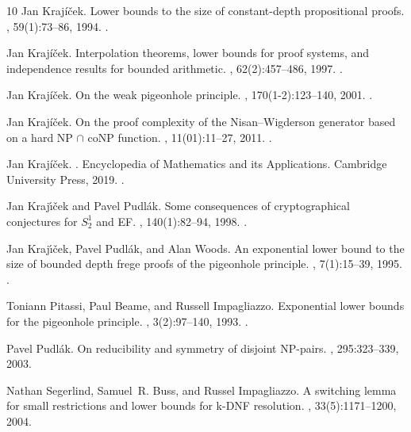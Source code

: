 \documentclass[10pt,a4paper]{article}
\theoremstyle{remark}
\newtheorem*{switching lemma}{Switching Lemma}
\newtheorem*{open problem}{Open Problem}
\theoremstyle{definition}
\begin{document}
\begin{thebibliography}{10}
Jan Kraj{\'i}{\v{c}}ek.
\newblock Lower bounds to the size of constant-depth propositional proofs.
, 59(1):73--86, 1994.
\newblock \href {http://dx.doi.org/10.2307/2275250}
  {}.

Jan Kraj{\'i}{\v{c}}ek.
\newblock Interpolation theorems, lower bounds for proof systems, and
  independence results for bounded arithmetic.
, 62(2):457--486, 1997.
\newblock \href {http://dx.doi.org/10.2307/2275541}
  {}.

Jan Kraj{\'i}{\v{c}}ek.
\newblock On the weak pigeonhole principle.
, 170(1-2):123--140, 2001.
\newblock \href {http://dx.doi.org/10.4064/fm170-1-8}
  {}.

Jan Kraj{\'i}{\v{c}}ek.
\newblock On the proof complexity of the {N}isan--{W}igderson generator based
  on a hard {NP} $\cap$ co{NP} function.
, 11(01):11--27, 2011.
\newblock \href {http://dx.doi.org/10.1142/S0219061311000979}
  {}.

Jan Kraj{\'i}{\v{c}}ek.
.
\newblock Encyclopedia of Mathematics and its Applications. Cambridge
  University Press, 2019.
\newblock \href {http://dx.doi.org/10.1017/9781108242066}
  {}.

Jan Kraj\'{\i}\v{c}ek and Pavel Pudl\'{a}k.
\newblock Some consequences of cryptographical conjectures for ${S}_2^1$ and
  {EF}.
, 140(1):82--94, 1998.
\newblock \href {http://dx.doi.org/10.1006/inco.1997.2674}
  {}.

Jan Kraj\'{\i}\v{c}ek, Pavel Pudl\'{a}k, and Alan Woods.
\newblock An exponential lower bound to the size of bounded depth frege proofs
  of the pigeonhole principle.
, 7(1):15--39, 1995.
\newblock \href {http://dx.doi.org/10.1002/rsa.3240070103}
  {}.

Toniann Pitassi, Paul Beame, and Russell Impagliazzo.
\newblock Exponential lower bounds for the pigeonhole principle.
, 3(2):97--140, 1993.
\newblock \href {http://dx.doi.org/10.1007/BF01200117}
  {}.

Pavel Pudl\'ak.
\newblock On reducibility and symmetry of disjoint {NP}-pairs.
, 295:323--339, 2003.

Nathan Segerlind, Samuel~R. Buss, and Russel Impagliazzo.
\newblock A switching lemma for small restrictions and lower bounds for k-{DNF}
  resolution.
, 33(5):1171--1200, 2004.

\end{thebibliography}
\end{document}
